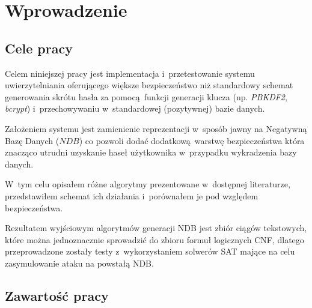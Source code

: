 \chapter{Wprowadzenie}
\section{Cele pracy}
Celem niniejszej pracy jest implementacja i~przetestowanie systemu uwierzytelniania oferującego większe bezpieczeństwo
niż standardowy schemat generowania skrótu hasła za pomocą funkcji generacji klucza (np. \textit{PBKDF2}, \textit{bcrypt})
i~przechowywaniu w~standardowej (pozytywnej) bazie danych.

Założeniem systemu jest zamienienie reprezentacji w~sposób jawny na Negatywną Bazę Danych ($NDB$) co pozwoli dodać 
dodatkową warstwę bezpieczeństwa która znacząco utrudni uzyskanie haseł użytkownika w~przypadku wykradzenia bazy danych.

W~tym celu opisałem różne algorytmy prezentowane w~dostępnej literaturze, przedstawiłem schemat ich działania i~porównałem
je pod względem bezpieczeństwa. 

Rezultatem wyjściowym algorytmów generacji NDB jest zbiór ciągów tekstowych, które można jednoznacznie sprowadzić 
do zbioru formuł logicznych CNF, dlatego przeprowadzone zostały testy z~wykorzystaniem solwerów SAT mające na celu 
zasymulowanie ataku na powstałą NDB.

\section{Zawartość pracy}

















